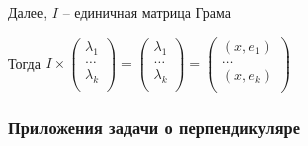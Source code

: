 \documentclass[12pt]{article}
\begin{document}
    \smallvspace

    Далее, $I$ -- единичная матрица Грама

    \Nota Тогда $I \times \begin{pmatrix}
    \lambda_1\\
    \ldots\\
    \lambda_k \\
    \end{pmatrix} = \begin{pmatrix}
    \lambda_1\\
    \ldots\\
    \lambda_k \\
    \end{pmatrix} = \begin{pmatrix}
    (x,e_1)\\
    \ldots\\
    (x,e_k) \\
    \end{pmatrix}$

    \subsubsection{Приложения задачи о перпендикуляре}
\end{document}
